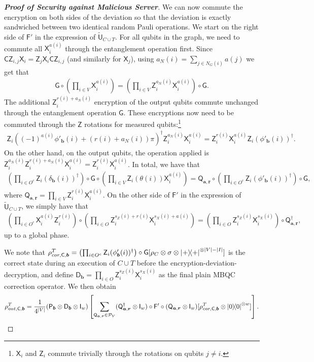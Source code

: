 \documentclass[12pt]{iopart}
\newcommand{\cptp}[1]{\mathsf{#1}} \newcommand{\pd}[1]{\mathcal{#1}}  \newcommand{\sch}[1]{\bm{#1}}
\newcommand{\Id}{\cptp{I}}
\newcommand{\X}{\cptp{X}}
\newcommand{\Z}{\cptp{Z}}
\renewcommand{\1}{\mathds{1}}
\newcommand{\CZ}{\mathsf{CZ}}
\newcommand{\TP}{C\cup T}
\begin{document}
\begin{proof}[\bf Proof of Security against Malicious Server]
We can now commute the encryption on both sides of the deviation so that the deviation is exactly sandwiched between two identical random Pauli operations. We start on the right side of $\cptp F'$ in the expression of $\tilde{\cptp U}_{\TP}$. For all qubits in the graph, we need to commute all $\X^{a(i)}_i$ through the entanglement operation first. Since $\CZ_{i, j}\X_i = \Z_j\X_i\CZ_{i, j}$ (and similarly for $\X_j$), using $a_N(i) = \sum_{j \in N_G(i)} a(j)$ we get that
\begin{align}
\cptp G \circ \left(\prod_{i \in V} \X_i^{a(i)}\right) = \left(\prod_{i \in V} \Z_i^{a_N(i)}\X_i^{a(i)}\right) \circ\cptp G.
\end{align}
The additional $\Z_i^{r(i) + a_N(i)}$ encryption of the output qubits commute unchanged through the entanglement operation $\cptp G$. These encryptions now need to be commuted through the $\Z$ rotations for measured qubits:\footnote{$\X_i$ and $\Z_i$ commute trivially through the rotations on qubits $j \neq i$.}
\begin{align}
\Z_i((-1)^{a(i)}\phi'_{\bm{b}}(i) + (r(i) + a_N(i)) \pi)^\dagger\Z_i^{a_N(i)}\X_i^{a(i)} = \Z_i^{r(i)}\X_i^{a(i)}\Z_i(\phi'_{\bm{b}}(i))^\dagger.
\end{align}
On the other hand, on the output qubits, the operation applied is $\Z_i^{a_N(i)}\Z_i^{r(i) + a_N(i)}\X_i^{a(i)} = \Z_i^{r(i)}\X_i^{a(i)}$. In total, we have that
\begin{align}
\left(\prod_{i \in O^c}\Z_i(\delta_{\bm{b}}(i))^\dagger\right)\circ \cptp G\circ \left(\prod_{i \in V} \Z_i(\theta(i))\X^{a(i)}_i\right) = \cptp Q_{\bm{a}, \bm{r}}\circ\left(\prod_{i \in O^c}\Z_i(\phi'_{\bm{b}}(i))^\dagger\right)\circ\cptp G,
\end{align}
where $\cptp Q_{\bm{a}, \bm{r}} = \prod_{i \in V} \Z_i^{r(i)}\X^{a(i)}_i$. On the other side of $\cptp F'$ in the expression of $\tilde{\cptp U}_{\TP}$, we simply have that
\begin{align}
\left(\prod_{i \in O^c} \X^{a(i)}_i\Z^{r(i)}_i\right)\circ \left(\prod_{i \in O}\Z_i^{s_Z(i) + r(i)}\X_i^{s_X(i) + a(i)}\right) = \left(\prod_{i \in O}\Z_i^{s_Z(i)}\X_i^{s_X(i)}\right)\circ \cptp Q_{\bm{a}, \bm{r}}^\dagger,
\end{align}
up to a global phase.

We note that $\rho_{cor, \cptp C, \bm{b}}^T = \left(\prod_{i \in O^c}\Z_i(\phi'_{\bm{b}}(i))^\dagger\right)\circ\cptp G [\rho_C \otimes \sigma \otimes \dyad{+}^{\otimes |V| - |I|}]$ is the correct state during an execution of $\TP$ before the encryption-deviation-decryption, and define $\cptp D_{\bm{b}} = \prod_{i \in O}\Z_i^{s_Z(i)}\X_i^{s_X(i)}$ as the final plain MBQC correction operator. We then obtain
\begin{align}
\rho_{out, \cptp C, \bm{b}}^T = \frac{1}{4^{|V|}} (\cptp P_{\bm{b}}\otimes \cptp D_{\bm{b}}\otimes\Id_w)\left[ \sum_{\cptp Q_{\bm{a}, \bm{r}} \in \mathcal P_V} (\cptp Q_{\bm{a}, \bm{r}}^\dagger \otimes \Id_w)\circ \cptp F'\circ (\cptp Q_{\bm{a}, \bm{r}}  \otimes \Id_w) [\rho_{cor, \cptp C, \bm{b}}^T\otimes\dyad{0}^{\otimes w}]\right].
\end{align}


\end{proof}
\end{document}
